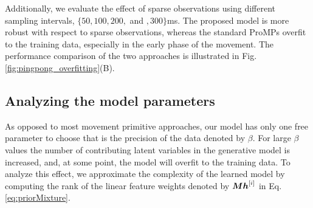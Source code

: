 
Additionally, we evaluate the effect of sparse observations using different sampling
intervals, $\{50, 100, 200, $ and $, 300\}$ms. The proposed model is more robust
with respect to sparse observations, whereas the standard ProMPs overfit to the
training data, especially in the early phase of the movement. The performance
comparison of the two approaches is illustrated in Fig.
\ref{fig:pingpong_overfitting}(B).


\subsection{Analyzing the model parameters}

As opposed to most movement primitive approaches, our model has only one free parameter to
choose that is the precision of the data denoted by $\beta$. For large $\beta$
values the number of contributing 
latent variables in the generative model is increased, and, at some point, the
model will overfit to the training data.  To analyze this effect, we approximate 
the complexity of the learned model by computing the rank of the linear feature
weights denoted by $\boldsymbol{M}  \boldsymbol{h}^{[i]} $ in Eq. \eqref{eq:priorMixture}. 

